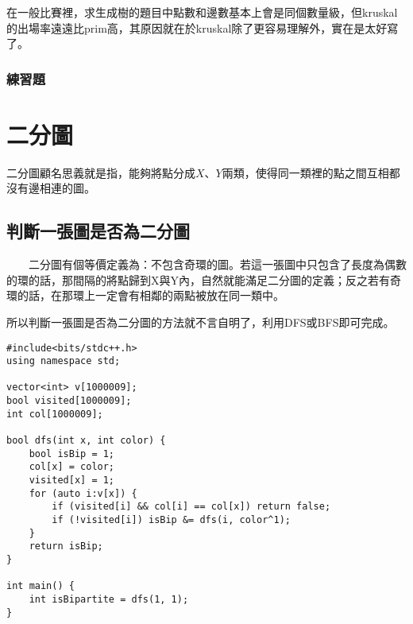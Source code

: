在一般比賽裡，求生成樹的題目中點數和邊數基本上會是同個數量級，但kruskal的出場率遠遠比prim高，其原因就在於kruskal除了更容易理解外，實在是太好寫了。

\subsubsection{練習題}





\section{二分圖}

二分圖顧名思義就是指，能夠將點分成$X$、$Y$兩類，使得同一類裡的點之間互相都沒有邊相連的圖。

\subsection{判斷一張圖是否為二分圖}

　　二分圖有個等價定義為：不包含奇環的圖。若這一張圖中只包含了長度為偶數的環的話，那間隔的將點歸到X與Y內，自然就能滿足二分圖的定義；反之若有奇環的話，在那環上一定會有相鄰的兩點被放在同一類中。

所以判斷一張圖是否為二分圖的方法就不言自明了，利用DFS或BFS即可完成。

\begin{lstlisting}[caption=判斷是否為二分圖 範例]
#include<bits/stdc++.h>
using namespace std;

vector<int> v[1000009];
bool visited[1000009];
int col[1000009];

bool dfs(int x, int color) {
	bool isBip = 1;
	col[x] = color;
	visited[x] = 1;
	for (auto i:v[x]) {
		if (visited[i] && col[i] == col[x]) return false;
		if (!visited[i]) isBip &= dfs(i, color^1);
	}
	return isBip;
} 

int main() {
	int isBipartite = dfs(1, 1);
}
\end{lstlisting}

